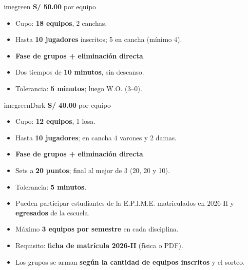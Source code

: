 \documentclass[11pt,a4paper]{article}
\begin{document}
\vspace{0.25cm}
\noindent
\begin{minipage}[t]{0.485\textwidth}
	\begin{tarjeta}[Futsal]{imegreen}
		{\Large\bfseries\color{imegreenDark} S/ 50.00} {\color{imegray} por equipo}
		\begin{itemize}
			\item Cupo: \textbf{18 equipos}, 2 canchas.
			\item Hasta \textbf{10 jugadores} inscritos; 5 en cancha (mínimo 4).
			\item \textbf{Fase de grupos + eliminación directa}.
			\item Dos tiempos de \textbf{10 minutos}, sin descanso.
			\item Tolerancia: \textbf{5 minutos}; luego W.O. (3--0).
		\end{itemize}
	\end{tarjeta}
\end{minipage}
\hfill
\begin{minipage}[t]{0.485\textwidth}
	\begin{tarjeta}{imegreenDark}
		{\Large\bfseries\color{imegreenDark} S/ 40.00} {\color{imegray} por equipo}
		\begin{itemize}
			\item Cupo: \textbf{12 equipos}, 1 losa.
			\item Hasta \textbf{10 jugadores}; en cancha 4 varones y 2 damas.
			\item \textbf{Fase de grupos + eliminación directa}.
			\item Sets a \textbf{20 puntos}; final al mejor de 3 (20, 20 y 10).
			\item Tolerancia: \textbf{5 minutos}.
		\end{itemize}
	\end{tarjeta}
\end{minipage}

\vspace{0.25cm}
\begin{tcolorbox}[enhanced, colback=white, colframe=imegold, boxrule=0.9pt, arc=3mm,
	left=4mm, right=4mm, top=2mm, bottom=2mm]
	\begin{itemize}
		\item Pueden participar estudiantes de la E.P.I.M.E. matriculados en 2026-II y \textbf{egresados} de la escuela.
		\item Máximo \textbf{3 equipos por semestre} en cada disciplina.
		\item Requisito: \textbf{ficha de matrícula 2026-II} (física o PDF).
		\item Los grupos se arman \textbf{según la cantidad de equipos inscritos} y el sorteo.
	\end{itemize}
\end{tcolorbox}
\end{document}
